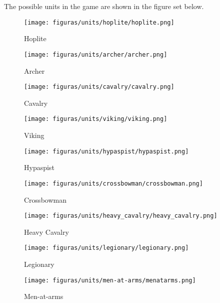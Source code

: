 The possible units in the game are shown in the figure set below.

\begin{figure}[H]
    \centering
    \begin{minipage}{0.12\textwidth}
        \centering
        \texttt{[image: figuras/units/hoplite/hoplite.png]}
        \caption{Hoplite}
    \end{minipage}\hspace{0.03\textwidth} %
    \begin{minipage}{0.12\textwidth}
        \centering
        \texttt{[image: figuras/units/archer/archer.png]}
        \caption{Archer}
    \end{minipage}\hspace{0.03\textwidth} %
    \begin{minipage}{0.12\textwidth}
        \centering
        \texttt{[image: figuras/units/cavalry/cavalry.png]}
        \caption{Cavalry}
    \end{minipage}\hspace{0.03\textwidth} %
    \begin{minipage}{0.12\textwidth}
        \centering
        \texttt{[image: figuras/units/viking/viking.png]}
        \caption{Viking}
    \end{minipage}

    \vspace{0.5cm}

    \begin{minipage}{0.12\textwidth}
        \centering
        \texttt{[image: figuras/units/hypaspist/hypaspist.png]}
        \caption{Hypaspist}
    \end{minipage}\hspace{0.03\textwidth}
    \begin{minipage}{0.12\textwidth}
        \centering
        \texttt{[image: figuras/units/crossbowman/crossbowman.png]}
        \caption{Crossbowman}
    \end{minipage}\hspace{0.03\textwidth} 
    \begin{minipage}{0.12\textwidth}
        \centering
        \texttt{[image: figuras/units/heavy\_cavalry/heavy\_cavalry.png]}
        \caption{Heavy Cavalry}
    \end{minipage}\hspace{0.03\textwidth}
    \begin{minipage}{0.12\textwidth}
        \centering
        \texttt{[image: figuras/units/legionary/legionary.png]}
        \caption{Legionary}
    \end{minipage}\hspace{0.03\textwidth}
    \begin{minipage}{0.12\textwidth}
        \centering
        \texttt{[image: figuras/units/men-at-arms/menatarms.png]}
        \caption{Men-at-arms}
    \end{minipage}
\end{figure}

